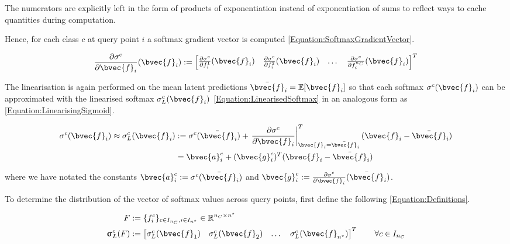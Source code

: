 			The numerators are explicitly left in the form of products of exponentiation instead of exponentiation of sums to reflect ways to cache quantities during computation. 
			
			Hence, for each class $c$ at query point $i$ a softmax gradient vector is computed \eqref{Equation:SoftmaxGradientVector}.
			
			\begin{equation}
				\frac{\partial \sigma^{c}}{\partial \bvec{f}_{i}}(\bvec{f}_{i}) := \begin{bmatrix} \frac{\partial \sigma^{c}}{\partial f^{1}_{i}}(\bvec{f}_{i}) & \frac{\partial \sigma^{c}}{\partial f^{2}_{i}}(\bvec{f}_{i}) & \dots & \frac{\partial \sigma^{c}}{\partial f^{n_{C}}_{i}}(\bvec{f}_{i}) \end{bmatrix}^{T}
			\label{Equation:SoftmaxGradientVector}
			\end{equation}
			
			The linearisation is again performed on the mean latent predictions $\bar{\bvec{f}}_{i} = \mathbb{E}[\bvec{f}_{i}]$ so that each softmax $\sigma^{c}(\bvec{f}_{i})$ can be approximated with the linearised softmax $\sigma^{c}_{L}(\bvec{f}_{i})$ \eqref{Equation:LinearisedSoftmax} in an analogous form as \eqref{Equation:LinearisingSigmoid}.
			
			\begin{equation}
				\begin{aligned}
					\sigma^{c}(\bvec{f}_{i}) \approx \sigma^{c}_{L}(\bvec{f}_{i}) & := \sigma^{c}(\bar{\bvec{f}}_{i}) + \left. \frac{\partial \sigma^{c}}{\partial \bvec{f}_{i}} \right|^{T}_{\bvec{f}_{i} = \bar{\bvec{f}}_{i}} (\bvec{f}_{i} - \bar{\bvec{f}}_{i}) \\
					& = \bvec{a}^{c}_{i} + (\bvec{g}^{c}_{i})^{T} (\bvec{f}_{i} - \bar{\bvec{f}}_{i})
				\end{aligned}
			\label{Equation:LinearisedSoftmax}
			\end{equation}
			
			where we have notated the constants $\bvec{a}^{c}_{i} := \sigma^{c}(\bar{\bvec{f}}_{i})$ and $\bvec{g}^{c}_{i} := \frac{\partial \sigma^{c}}{\partial \bvec{f}_{i}}(\bar{\bvec{f}}_{i})$.
			
			To determine the distribution of the vector of softmax values across query points, first define the following \eqref{Equation:Definitions}.
			
			\begin{equation}
				\begin{aligned}
					F &:= \{f^{c}_{i}\}_{c \in I_{n_{C}}, i \in I_{n^{\star}}} \in \mathbb{R}^{n_{C} \times n^{\star}} \\
					\vec{\upsigma}^{c}_{L}(F) &:= \begin{bmatrix} \sigma^{c}_{L}(\bvec{f}_{1}) & \sigma^{c}_{L}(\bvec{f}_{2}) & \dots & \sigma^{c}_{L}(\bvec{f}_{n^{\star}}) \end{bmatrix}^{T} \qquad \forall c \in I_{n_{C}}
				\end{aligned}
			\label{Equation:Definitions}
			\end{equation}
						
